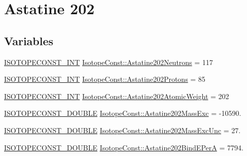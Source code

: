 \hypertarget{group___isotope_const-_astatine-_at202}{}\section{Astatine 202}
\label{group___isotope_const-_astatine-_at202}
\subsection*{Variables}
\begin{DoxyCompactItemize}
\item 
\mbox{\hyperlink{group___isotope_const-_macros_ga5f18360b3e99483a35c32d789e62621c}{I\+S\+O\+T\+O\+P\+E\+C\+O\+N\+S\+T\+\_\+\+I\+NT}} \mbox{\hyperlink{group___isotope_const-_astatine-_at202_gae79ff01d6f14889db10ff955bfaef671}{Isotope\+Const\+::\+Astatine202\+Neutrons}} = 117
\item 
\mbox{\hyperlink{group___isotope_const-_macros_ga5f18360b3e99483a35c32d789e62621c}{I\+S\+O\+T\+O\+P\+E\+C\+O\+N\+S\+T\+\_\+\+I\+NT}} \mbox{\hyperlink{group___isotope_const-_astatine-_at202_ga09b3a00c5501568607826b89540da63c}{Isotope\+Const\+::\+Astatine202\+Protons}} = 85
\item 
\mbox{\hyperlink{group___isotope_const-_macros_ga5f18360b3e99483a35c32d789e62621c}{I\+S\+O\+T\+O\+P\+E\+C\+O\+N\+S\+T\+\_\+\+I\+NT}} \mbox{\hyperlink{group___isotope_const-_astatine-_at202_ga4b9a7531f90251ffd98a7b38ad1e87c6}{Isotope\+Const\+::\+Astatine202\+Atomic\+Weight}} = 202
\item 
\mbox{\hyperlink{group___isotope_const-_macros_ga8f45a7272ce02c0b4c65c44636ed719a}{I\+S\+O\+T\+O\+P\+E\+C\+O\+N\+S\+T\+\_\+\+D\+O\+U\+B\+LE}} \mbox{\hyperlink{group___isotope_const-_astatine-_at202_gade3b89fe9b7683c6f915d56ef60dbdc8}{Isotope\+Const\+::\+Astatine202\+Mass\+Exc}} = -\/10590.
\item 
\mbox{\hyperlink{group___isotope_const-_macros_ga8f45a7272ce02c0b4c65c44636ed719a}{I\+S\+O\+T\+O\+P\+E\+C\+O\+N\+S\+T\+\_\+\+D\+O\+U\+B\+LE}} \mbox{\hyperlink{group___isotope_const-_astatine-_at202_ga4d5c4e2a8bee496262d450a053f88035}{Isotope\+Const\+::\+Astatine202\+Mass\+Exc\+Unc}} = 27.
\item 
\mbox{\hyperlink{group___isotope_const-_macros_ga8f45a7272ce02c0b4c65c44636ed719a}{I\+S\+O\+T\+O\+P\+E\+C\+O\+N\+S\+T\+\_\+\+D\+O\+U\+B\+LE}} \mbox{\hyperlink{group___isotope_const-_astatine-_at202_gaa8a60150a4686e9f2609971f8ff8633a}{Isotope\+Const\+::\+Astatine202\+Bind\+E\+PerA}} = 7794.
\item 

\end{DoxyCompactItemize}
